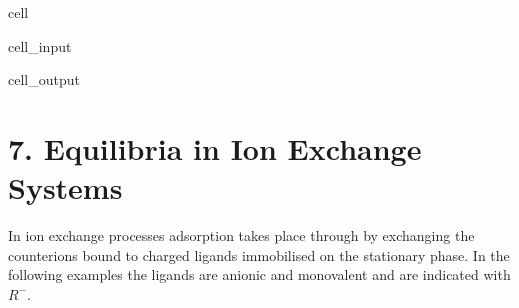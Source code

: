 \documentclass[letterpaper,10pt,english]{jupyterBook}
\begin{document}
\begin{sphinxuseclass}{cell}
\begin{sphinxVerbatimInput}
\begin{sphinxuseclass}{cell_input}
\begin{sphinxVerbatim}[commandchars=\\\{\}]
    
 
 
\PYG{p}{[}\PYG{p}{]} 
\end{sphinxVerbatim}

\end{sphinxuseclass}\end{sphinxVerbatimInput}
\begin{sphinxVerbatimOutput}

\begin{sphinxuseclass}{cell_output}
\noindent{}

\end{sphinxuseclass}\end{sphinxVerbatimOutput}

\end{sphinxuseclass}
\sphinxstepscope


\section{7. Equilibria in Ion Exchange Systems}
\label{\detokenize{Ion_Exchange:equilibria-in-ion-exchange-systems}}\label{\detokenize{Ion_Exchange::doc}}
\sphinxAtStartPar
In ion exchange processes adsorption takes place through by exchanging the counterions bound to charged ligands immobilised on the stationary phase.
In the following examples the ligands are anionic and monovalent and are indicated with \(R^-\).
\end{document}
